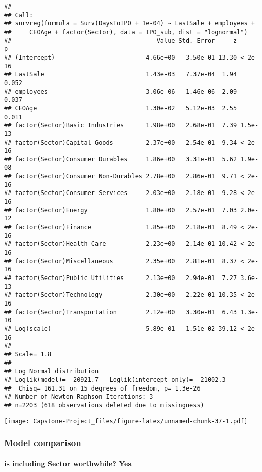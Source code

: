 \documentclass[]{article}
\let\oldparagraph\paragraph
\renewcommand{\paragraph}[1]{\oldparagraph{#1}\mbox{}}
\begin{document}
\begin{verbatim}
## 
## Call:
## survreg(formula = Surv(DaysToIPO + 1e-04) ~ LastSale + employees + 
##     CEOAge + factor(Sector), data = IPO_sub, dist = "lognormal")
##                                        Value Std. Error     z       p
## (Intercept)                         4.66e+00   3.50e-01 13.30 < 2e-16
## LastSale                            1.43e-03   7.37e-04  1.94   0.052
## employees                           3.06e-06   1.46e-06  2.09   0.037
## CEOAge                              1.30e-02   5.12e-03  2.55   0.011
## factor(Sector)Basic Industries      1.98e+00   2.68e-01  7.39 1.5e-13
## factor(Sector)Capital Goods         2.37e+00   2.54e-01  9.34 < 2e-16
## factor(Sector)Consumer Durables     1.86e+00   3.31e-01  5.62 1.9e-08
## factor(Sector)Consumer Non-Durables 2.78e+00   2.86e-01  9.71 < 2e-16
## factor(Sector)Consumer Services     2.03e+00   2.18e-01  9.28 < 2e-16
## factor(Sector)Energy                1.80e+00   2.57e-01  7.03 2.0e-12
## factor(Sector)Finance               1.85e+00   2.18e-01  8.49 < 2e-16
## factor(Sector)Health Care           2.23e+00   2.14e-01 10.42 < 2e-16
## factor(Sector)Miscellaneous         2.35e+00   2.81e-01  8.37 < 2e-16
## factor(Sector)Public Utilities      2.13e+00   2.94e-01  7.27 3.6e-13
## factor(Sector)Technology            2.30e+00   2.22e-01 10.35 < 2e-16
## factor(Sector)Transportation        2.12e+00   3.30e-01  6.43 1.3e-10
## Log(scale)                          5.89e-01   1.51e-02 39.12 < 2e-16
## 
## Scale= 1.8 
## 
## Log Normal distribution
## Loglik(model)= -20921.7   Loglik(intercept only)= -21002.3
##  Chisq= 161.31 on 15 degrees of freedom, p= 1.3e-26 
## Number of Newton-Raphson Iterations: 3 
## n=2203 (618 observations deleted due to missingness)
\end{verbatim}

\texttt{[image: Capstone-Project\_files/figure-latex/unnamed-chunk-37-1.pdf]}

\hypertarget{model-comparison}{%
\subsubsection{Model comparison}\label{model-comparison}}

\hypertarget{is-including-sector-worthwhile-yes}{%
\paragraph{is including Sector worthwhile?
Yes}\label{is-including-sector-worthwhile-yes}}
\end{document}
